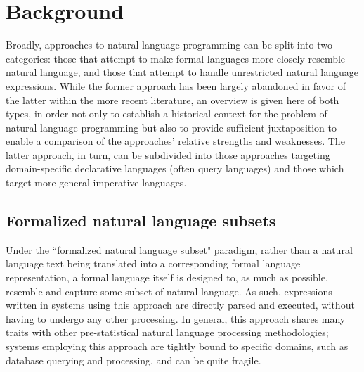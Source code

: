 \documentclass[a4paper,11pt]{proposal}
\begin{document}
\section{Background} \label{sec:back}
Broadly, approaches to natural language programming can be split into two categories: those that attempt to make formal languages more closely resemble natural language, and those that attempt to handle unrestricted natural language expressions. While the former approach has been largely abandoned in favor of the latter within the more recent literature, an overview is given here of both types, in order not only to establish a historical context for the problem of natural language programming but also to provide sufficient juxtaposition to enable a comparison of the approaches' relative strengths and weaknesses. The latter approach, in turn, can be subdivided into those approaches targeting domain-specific declarative languages (often query languages) and those which target more general imperative languages.

\subsection{Formalized natural language subsets}

Under the ``formalized natural language subset" paradigm, rather than a natural language text being translated into a corresponding formal language representation, a formal language itself is designed to, as much as possible, resemble and capture some subset of natural language. As such, expressions written in systems using this approach are directly parsed and executed, without having to undergo any other processing. In general, this approach shares many traits with other pre-statistical natural language processing methodologies; systems employing this approach are tightly bound to specific domains, such as database querying and processing, and can be quite fragile. 
\end{document}
